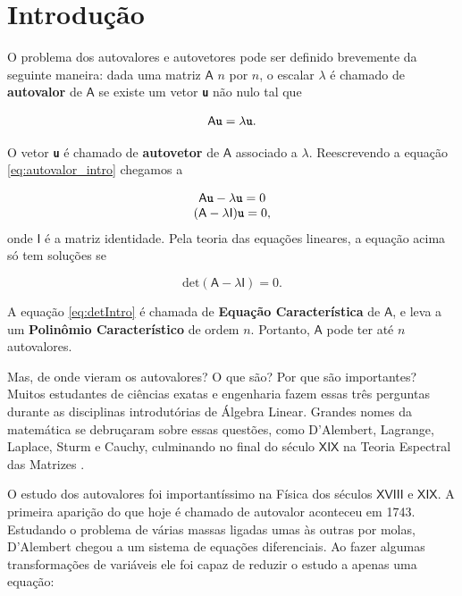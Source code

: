 \chapter{Introdução}
\label{cap:introducao}

\setcounter{page}{12}

	O problema dos autovalores e autovetores pode ser definido brevemente da seguinte maneira: dada uma matriz $\mathsf{A}$ $n$ por $n$, o escalar $\lambda$ é chamado de \textbf{autovalor} de $\mathsf{A}$ se existe um vetor \textbf{\texttt{u}} não nulo tal que

\begin{equation}\label{eq:autovalor_intro}
	\mathsf{A} \textbf{\texttt{u}} = \lambda \textbf{\texttt{u}}.
\end{equation}

O vetor \textbf{\texttt{u}} é chamado de \textbf{autovetor} de $\mathsf{A}$ associado a $\lambda$. Reescrevendo a equação \ref{eq:autovalor_intro} chegamos a 

\begin{equation}
		\begin{array}{c}
			\mathsf{A} \textbf{\texttt{u}} - \lambda \textbf{\texttt{u}} = 0 \\
			(\mathsf{A} - \lambda \mathsf{I})\textbf{\texttt{u}} = 0,
		\end{array}
\end{equation}
onde $\mathsf{I}$ é a matriz identidade. Pela teoria das equações lineares, a equação acima só tem soluções se

\begin{equation}\label{eq:detIntro}
	\mbox{det}(\mathsf{A} - \lambda \mathsf{I}) = 0.
\end{equation}

A equação \ref{eq:detIntro} é chamada de \textbf{Equação Característica} de $\mathsf{A}$, e leva a um \textbf{Polinômio Característico} de ordem $n$. Portanto, $\mathsf{A}$ pode ter até $n$ autovalores.

	Mas, de onde vieram os autovalores? O que são? Por que são importantes? Muitos estudantes de ciências exatas e engenharia fazem essas três perguntas durante as disciplinas introdutórias de Álgebra Linear. Grandes nomes da matemática se debruçaram sobre essas questões, como D'Alembert, Lagrange, Laplace, Sturm e Cauchy, culminando no final do século $\mathsf{XIX}$ na Teoria Espectral das Matrizes \cite{Hawkins75}.
	
	O estudo dos autovalores foi importantíssimo na Física dos séculos $\mathsf{XVIII}$ e $\mathsf{XIX}$. A primeira aparição do que hoje é chamado de autovalor aconteceu em 1743. Estudando o problema de várias massas ligadas umas às outras por molas, D'Alembert chegou a um sistema de equações diferenciais. Ao fazer algumas transformações de variáveis ele foi capaz de reduzir o estudo a apenas uma equação:

